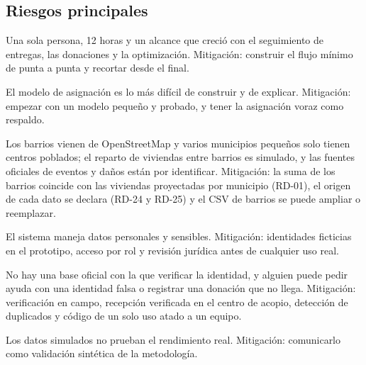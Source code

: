\subsection{Riesgos principales}
\begin{description}[leftmargin=0pt]
  \item[Tiempo.] Una sola persona, 12 horas y un alcance que creció con el seguimiento de entregas, las donaciones y la optimización. Mitigación: construir el flujo mínimo de punta a punta y recortar desde el final.
  \item[Optimización.] El modelo de asignación es lo más difícil de construir y de explicar. Mitigación: empezar con un modelo pequeño y probado, y tener la asignación voraz como respaldo.
  \item[Datos.] Los barrios vienen de OpenStreetMap y varios municipios pequeños solo tienen centros poblados; el reparto de viviendas entre barrios es simulado, y las fuentes oficiales de eventos y daños están por identificar. Mitigación: la suma de los barrios coincide con las viviendas proyectadas por municipio (RD-01), el origen de cada dato se declara (RD-24 y RD-25) y el CSV de barrios se puede ampliar o reemplazar.
  \item[Privacidad.] El sistema maneja datos personales y sensibles. Mitigación: identidades ficticias en el prototipo, acceso por rol y revisión jurídica antes de cualquier uso real.
  \item[Fraude.] No hay una base oficial con la que verificar la identidad, y alguien puede pedir ayuda con una identidad falsa o registrar una donación que no llega. Mitigación: verificación en campo, recepción verificada en el centro de acopio, detección de duplicados y código de un solo uso atado a un equipo.
  \item[Validez de los resultados.] Los datos simulados no prueban el rendimiento real. Mitigación: comunicarlo como validación sintética de la metodología.
\end{description}
